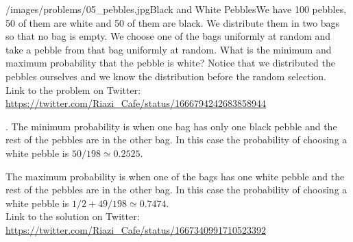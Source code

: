 \begin{problem}{/images/problems/05_pebbles.jpg}{Black and White Pebbles}We have 100 pebbles, 50 of them are white and 50 of them are black. We distribute them in two bags so that no bag is empty. We choose one of the bags uniformly at random and take a pebble from that bag uniformly at random. What is the minimum and maximum probability that the pebble is white? Notice that we distributed the pebbles ourselves and we know the distribution before the random selection.\\[0.2cm]

Link to the problem on Twitter:  \url{https://twitter.com/Riazi_Cafe/status/1666794242683858944}\end{problem}
\begin{solution}.
The minimum probability is when one bag has only one black pebble and the rest of the pebbles are in the other bag. In this case the probability of choosing a white pebble is $50/198 \simeq 0.2525$.

The maximum probability is when one of the bags has one white pebble and the rest of the pebbles are in the other bag.  In this case the probability of choosing a white pebble is $1/2 + 49/198 \simeq 0.7474$.\\[0.2cm]

Link to the solution on Twitter:  \url{https://twitter.com/Riazi_Cafe/status/1667340991710523392}\end{solution}
